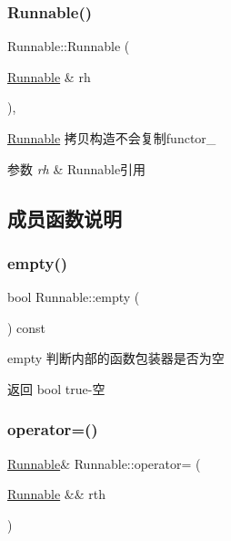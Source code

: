 \subsubsection{\texorpdfstring{Runnable()}{Runnable()}\hspace{0.1cm}{\footnotesize\ttfamily [3/3]}}
{\footnotesize\ttfamily Runnable\+::\+Runnable (\begin{DoxyParamCaption}\item[{\hyperlink{classRunnable}{Runnable} \&}]{rh }\end{DoxyParamCaption})\hspace{0.3cm}{\ttfamily [inline]}, {\ttfamily [explicit]}}



\hyperlink{classRunnable}{Runnable} 拷贝构造不会复制functor\+\_\+ 


\begin{DoxyParams}{参数}
{\em rh} & Runnable引用 \\
\hline
\end{DoxyParams}


\subsection{成员函数说明}
\mbox{\label{classRunnable_a3abba14a5cf19709cef2d299ee68acae}} 
\subsubsection{\texorpdfstring{empty()}{empty()}}
{\footnotesize\ttfamily bool Runnable\+::empty (\begin{DoxyParamCaption}{ }\end{DoxyParamCaption}) const\hspace{0.3cm}{\ttfamily [inline]}}



empty 判断内部的函数包装器是否为空 

\begin{DoxyReturn}{返回}
bool true-\/空 
\end{DoxyReturn}
\mbox{\label{classRunnable_ab41eea27867a9f54e94255851412bc77}} 
\subsubsection{\texorpdfstring{operator=()}{operator=()}\hspace{0.1cm}{\footnotesize\ttfamily [1/2]}}
{\footnotesize\ttfamily \hyperlink{classRunnable}{Runnable}\& Runnable\+::operator= (\begin{DoxyParamCaption}\item[{\hyperlink{classRunnable}{Runnable} \&\&}]{rth }\end{DoxyParamCaption})\hspace{0.3cm}{\ttfamily [inline]}}



